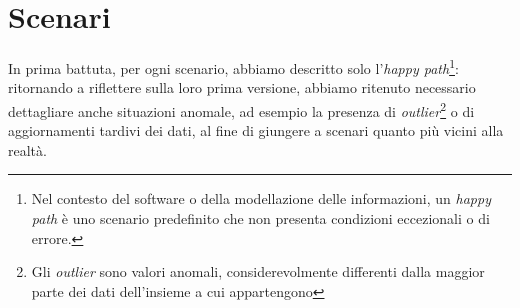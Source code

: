 \section{Scenari}
\label{s:scenari}
In prima battuta, per ogni scenario, abbiamo descritto solo l'\textit{happy path}\footnote{Nel contesto del software o della modellazione delle informazioni, un \textit{happy path} è uno scenario predefinito che non presenta condizioni eccezionali o di errore.}: ritornando a riflettere sulla loro prima versione, abbiamo ritenuto necessario dettagliare anche situazioni anomale, ad esempio la presenza di \textit{outlier}\footnote{Gli \textit{outlier} sono valori anomali, considerevolmente differenti dalla maggior parte dei dati dell'insieme a cui appartengono} o di aggiornamenti tardivi dei dati, al fine di giungere a scenari quanto più vicini alla realtà.










